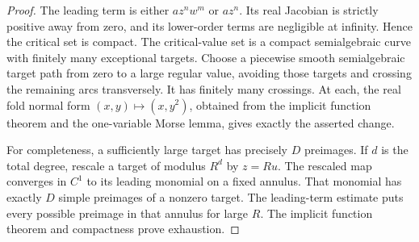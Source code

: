 \documentclass[UTF8,11pt]{ctexart}
\theoremstyle{definition}
\numberwithin{equation}{section}
\begin{document}
\begin{proof}
The leading term is either $az^nw^m$ or $az^n$. Its real
Jacobian is strictly positive away from zero, and its lower-order
terms are negligible at infinity. Hence the critical set is compact.
The critical-value set is a compact semialgebraic curve with finitely
many exceptional targets. Choose a piecewise smooth semialgebraic
target path from zero to a large regular value, avoiding those
targets and crossing the remaining arcs transversely. It has
finitely many crossings. At each, the real fold normal form
$(x,y)\mapsto(x,y^2)$, obtained from the implicit function theorem
and the one-variable Morse lemma, gives exactly the asserted change.

For completeness, a sufficiently large target has precisely $D$
preimages. If $d$ is the total degree, rescale a target of modulus
$R^d$ by $z=Ru$. The rescaled map converges in $C^1$ to its
leading monomial on a fixed annulus. That monomial has exactly
$D$ simple preimages of a nonzero target. The leading-term estimate
puts every possible preimage in that annulus for large $R$.
The implicit function theorem and compactness prove exhaustion.
\end{proof}
\end{document}
